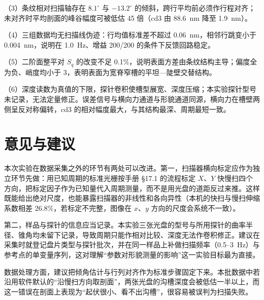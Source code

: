 （3）条纹相对扫描轴存在 $8.1^\circ$ 与 $-13.2^\circ$ 的倾斜，跨行平均前必须作行程对齐；未对齐时平均剖面的峰谷幅度可被低估 45 倍（cd3 由 88.6~nm 降至 1.9~nm）。

（4）三组数据均无扫描线伪迹：行均值标准差不超过 0.06~nm，相邻行跳变小于 0.004~nm，说明在 1.0~Hz、增益 200/200 的条件下反馈回路稳定。

（5）二阶面整平对 $S_q$ 的改变不足 0.1\%，说明表面方差由条纹结构主导；偏度全为负、峭度均小于 3，表明表面为宽脊窄槽的平坦—陡壁交替结构。

（6）深度读数为真值的下限，探针卷积使槽型展宽、深度压缩；本实验探针型号未记录，无法定量修正。误差信号与横向力通道与形貌通道同源，横向力在槽壁两侧呈反对称偏转，cd3 的相对幅度最大，与其结构最深、周期最短一致。

\section{意见与建议}

本次实验在数据采集之外的环节有两处可以改进。第一，扫描器横向标定应作为独立环节先做：用已知周期的标准光栅按手册 §17.1 的流程标定 $X$、$Y$ 快慢扫四个方向，把标定因子作为已知量代入周期测量，而不是用光盘的道距反过来推。这样既能给出绝对尺度，也能暴露扫描器的非线性和各向异性（本机的快扫与慢扫伸缩系数相差 26.8\%，若标定不完整，图像在 $x$、$y$ 方向的尺度会系统不一致）。

第二，样品与探针的信息应当记录。本实验三张光盘的型号与所用探针的曲率半径、锥角均未留下记录，导致周期只能作相对比较、深度无法作卷积修正。建议在采集时就登记盘片类型与探针批次，并在同一样品上补做扫描频率（0.5--3~Hz）与参考点的单变量序列，这对理解“参数对形貌测量的影响”这一实验目标最为直接。

数据处理方面，建议把倾角估计与行列对齐作为标准步骤固定下来。本批数据中若沿用软件默认的“沿慢扫方向取剖面”，两张光盘的沟槽深度会被低估一半以上，而这一错误在剖面上表现为“起伏很小、看不出沟槽”，很容易被误判为扫描失败。

